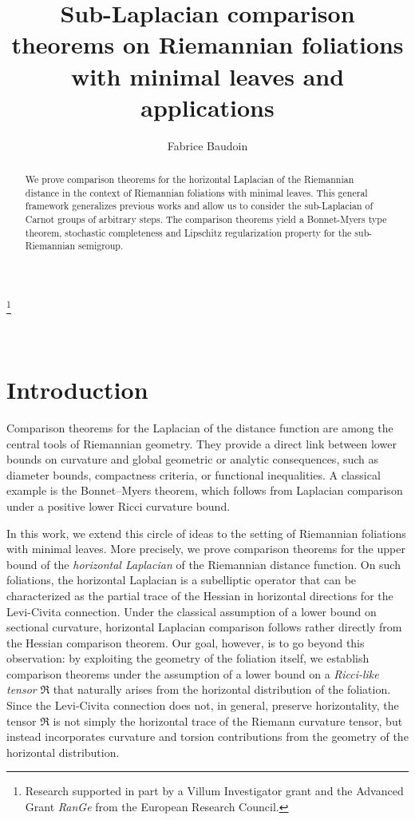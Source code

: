 \documentclass[11pt]{article}
\title{Sub-Laplacian comparison theorems on  Riemannian foliations with minimal leaves and applications}
\author{Fabrice Baudoin
}
\affil{Department of Mathematics, Aarhus University\par
   \texttt{fbaudoin@math.au.dk}\vspace{1em}}
\numberwithin{equation}{section}
\begin{document}
\maketitle

\newcommand\blfootnote[1]{%
  \begingroup
  \renewcommand\thefootnote{}\footnote{#1}%
  \addtocounter{footnote}{-1}%
  \endgroup
}
\blfootnote{Research supported in part by a Villum Investigator grant and the Advanced Grant \emph{RanGe} from the European Research Council.}



\begin{abstract}
We prove comparison theorems for the horizontal Laplacian of the Riemannian distance in the context of Riemannian foliations with minimal leaves. This general framework generalizes  previous works and allow us to consider the sub-Laplacian of Carnot groups of arbitrary steps. The comparison theorems yield a Bonnet-Myers type theorem, stochastic completeness and Lipschitz regularization property for the sub-Riemannian semigroup.
\end{abstract}

\

\tableofcontents

\section{Introduction}


Comparison theorems for the Laplacian of the distance function are among the
central tools of Riemannian geometry. They provide a direct link between lower
bounds on curvature and global geometric or analytic consequences, such as
diameter bounds, compactness criteria, or functional inequalities. A classical
example is the Bonnet--Myers theorem, which follows from Laplacian comparison
under a positive lower Ricci curvature bound. 

In this work, we extend this circle of ideas to the setting of Riemannian
foliations with minimal leaves. More precisely, we prove comparison theorems
for the upper bound of the \emph{horizontal Laplacian} of the Riemannian
distance function. On such foliations, the horizontal Laplacian is a subelliptic operator that can be
characterized as the partial trace of the Hessian in horizontal directions for
the Levi-Civita connection. Under the classical assumption of a lower bound on
sectional curvature, horizontal Laplacian comparison follows rather directly
from the Hessian comparison theorem. Our goal, however, is to go beyond this
observation: by exploiting the geometry of the foliation itself, we establish
comparison theorems under the assumption of a lower bound on a
\emph{Ricci-like tensor} $\mathfrak R$ that naturally arises from the horizontal distribution of the foliation. Since
the Levi-Civita connection does not, in general, preserve horizontality, the
tensor $\mathfrak R$ is not simply the horizontal trace of the Riemann curvature tensor,
but instead incorporates  curvature and torsion contributions from the geometry of the
horizontal distribution. 
\end{document}
